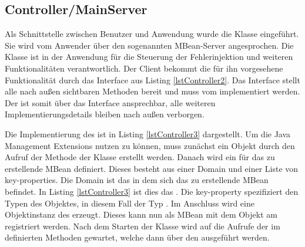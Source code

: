 \subsection{Controller/MainServer}

Als Schnittstelle zwischen Benutzer und Anwendung wurde die Klasse  eingef\"uhrt. Sie wird vom Anwender \"uber den sogenannten MBean-Server angesprochen. Die Klasse  ist in der Anwendung f\"ur die Steuerung der Fehlerinjektion und weiteren Funktionalitäten verantwortlich. Der Client bekommt die f\"ur ihn vorgesehene Funktionalit\"at durch das Interface  aus Listing \ref{lstController2}. Das Interface stellt alle nach au\ss en sichtbaren Methoden bereit und muss vom  implementiert werden. Der  ist somit \"uber das Interface ansprechbar, alle weiteren Implementierungsdetails bleiben nach au\ss en verborgen.

\begin{figure}[!htb]
	
\end{figure}

Die Implementierung des  ist in Listing \ref{lstController3} dargestellt. Um die Java Management Extensions nutzen zu k\"onnen, muss zun\"achst ein  Objekt durch den Aufruf der Methode  der Klasse  erstellt werden. Danach wird ein  f\"ur das zu erstellende  MBean definiert. Dieses besteht aus einer Domain und einer Liste von key-properties. Die Domain ist das  in dem sich das zu erstellende MBean befindet. In Listing \ref{lstController3} ist dies das . Die key-property spezifiziert den Typen des Objektes, in diesem Fall der Typ . Im Anschluss wird eine Objektinstanz des  erzeugt. Dieses kann nun als MBean mit dem  Objekt am  registriert werden. Nach dem Starten der Klasse  wird auf die Aufrufe der im  definierten Methoden gewartet, welche dann \"uber den  ausgef\"uhrt werden.

\begin{figure}[!htb]
	
\end{figure}

